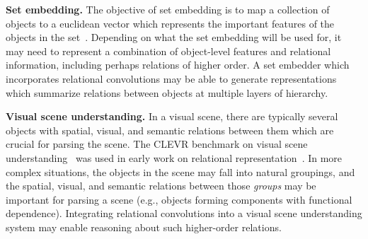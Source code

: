 \textbf{Set embedding.} The objective of set embedding is to map a collection of objects to a euclidean vector which represents the important features of the objects in the set~\citep{zaheer2017deep}. Depending on what the set embedding will be used for, it may need to represent a combination of object-level features and relational information, including perhaps relations of higher order. A set embedder which incorporates relational convolutions may be able to generate representations which summarize relations between objects at multiple layers of hierarchy.

\textbf{Visual scene understanding.} In a visual scene, there are typically several objects with spatial, visual, and semantic relations between them which are crucial for parsing the scene. The CLEVR benchmark on visual scene understanding~\citep{johnson2017clevr} was used in early work on relational representation~\citep{santoroSimpleNeural2017}. In more complex situations, the objects in the scene may fall into natural groupings, and the spatial, visual, and semantic relations between those \textit{groups} may be important for parsing a scene (e.g., objects forming components with functional dependence). Integrating relational convolutions into a visual scene understanding system may enable reasoning about such higher-order relations.